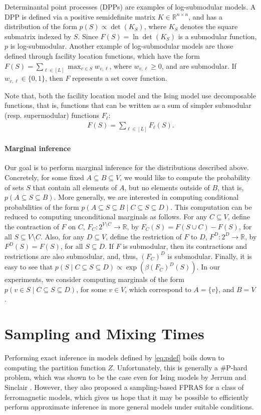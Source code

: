 Determinantal point processes (DPPs) are examples of log-submodular models.
A DPP is defined via a positive semidefinite matrix $K \in \mathbb{R}^{n \times n}$, and has a distribution of the form $p(S) \propto \det(K_S)$, where $K_S$ denotes the square submatrix indexed by $S$.
Since $F(S) = \ln \det(K_S)$ is a submodular function, $p$ is log-submodular.
Another example of log-submodular models are those defined through facility location functions, which have the form $F(S) = \sum_{\ell \in [L]} \max_{v \in S}w_{v,\ell}$, where $w_{v,\ell} \geq 0$, and are submodular.
If $w_{v,\ell} \in \{0, 1\}$, then $F$ represents a set cover function.

Note that, both the facility location model and the Ising model use decomposable functions, that is, functions that can be written as a sum of simpler submodular (resp. supermodular) functions $F_{\ell}$:
\begin{align} \label{eq:fdec}
F(S) = \sum_{\ell \in [L]} F_{\ell}(S).
\end{align}

\paragraph{Marginal inference}
Our goal is to perform marginal inference for the distributions described above.
Concretely, for some fixed $A \subseteq B \subseteq V$, we would like to compute the probability of sets $S$ that contain all elements of $A$, but no elements outside of $B$, that is, $p(A \subseteq S \subseteq B)$.
More generally, we are interested in computing conditional probabilities of the form $p(A \subseteq S \subseteq B \mid C \subseteq S \subseteq D)$.
This computation can be reduced to computing unconditional marginals as follows.
For any $C \subseteq V$, define the contraction of $F$ on $C$, $F_C : 2^{V \setminus C} \to \mathbb{R}$, by $F_C(S) = F(S \cup C) - F(S)$, for all $S \subseteq V \setminus C$.
Also, for any $D \subseteq V$, define the restriction of $F$ to $D$, $F^D : 2^D \to \mathbb{R}$, by $F^D(S) = F(S)$, for all $S \subseteq D$.
If $F$ is submodular, then its contractions and restrictions are also submodular, and, thus, $(F_C)^D$ is submodular.
Finally, it is easy to see that $p(S \mid C \subseteq S \subseteq D) \propto \exp(\beta (F_C)^D(S))$.
In our experiments, we consider computing marginals of the form $p(v \in S \mid C \subseteq S \subseteq D)$, for some $v \in V$, which correspond to $A = \{v\}$, and $B = V$.

\section{Sampling and Mixing Times}
Performing exact inference in models defined by \eqref{eq:pdef} boils down to computing the partition function $Z$.
Unfortunately, this is generally a \#P-hard problem, which was shown to be the case even for Ising models by Jerrum and Sinclair \cite{jerrum93}.
However, they also proposed a sampling-based FPRAS for a class of ferromagnetic models, which gives us hope that it may be possible to efficiently perform approximate inference in more general models under suitable conditions.

